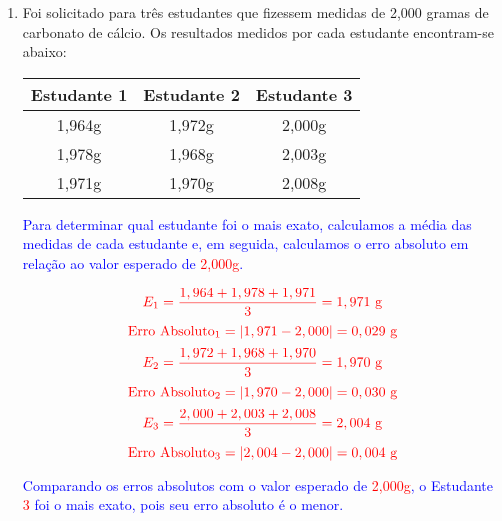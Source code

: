 \documentclass[a4paper, 12pt]{article}
\begin{document}
\begin{enumerate}
    \item Foi solicitado para três estudantes que fizessem medidas de 2,000 gramas de carbonato de cálcio. Os resultados medidos por cada estudante encontram-se abaixo:

          \begin{center}
              \begin{tabular}{c|c|c}
                  \hline
                  \textbf{Estudante 1} & \textbf{Estudante 2} & \textbf{Estudante 3} \\
                  \hline
                  1,964g               & 1,972g               & 2,000g               \\
                  1,978g               & 1,968g               & 2,003g               \\
                  1,971g               & 1,970g               & 2,008g               \\
              \end{tabular}
          \end{center}

          \textcolor{blue}{
              Para determinar qual estudante foi o mais exato, calculamos a média das medidas de cada estudante e, em seguida, calculamos o erro absoluto em relação ao valor esperado de \textcolor{red}{2,000g}.
          }

          \textcolor{blue}{
              \[
                  \textcolor{red}{E_1 = \frac{1,964 + 1,978 + 1,971}{3} = 1,971 \ \text{g}}
              \]
              \[
                  \textcolor{red}{\text{Erro Absoluto}_1 = |1,971 - 2,000| = 0,029 \ \text{g}}
              \]
              \[
                  \textcolor{red}{E_2 = \frac{1,972 + 1,968 + 1,970}{3} = 1,970 \ \text{g}}
              \]
              \[
                  \textcolor{red}{\text{Erro Absoluto}_2 = |1,970 - 2,000| = 0,030 \ \text{g}}
              \]
              \[
                  \textcolor{red}{E_3 = \frac{2,000 + 2,003 + 2,008}{3} = 2,004 \ \text{g}}
              \]
              \[
                  \textcolor{red}{\text{Erro Absoluto}_3 = |2,004 - 2,000| = 0,004 \ \text{g}}
              \]
          }

          \textcolor{blue}{
              Comparando os erros absolutos com o valor esperado de \textcolor{red}{2,000g}, o Estudante \textcolor{red}{3} foi o mais exato, pois seu erro absoluto é o menor.
          }


\end{enumerate}
\end{document}
